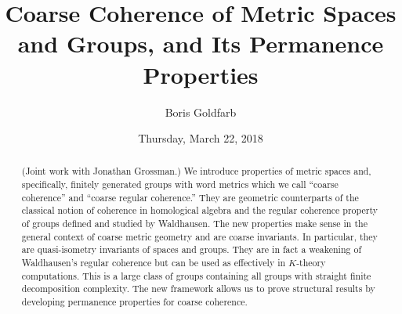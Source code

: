 \documentclass{UAmathtalk}
\author{Boris Goldfarb}
\title{Coarse Coherence of Metric Spaces and Groups, and Its Permanence Properties}
\date{Thursday, March 22, 2018}
\begin{document}
\maketitle

\begin{abstract}
(Joint work with Jonathan Grossman.)
We introduce properties of metric spaces and, specifically, finitely generated groups with word metrics which we call ``coarse coherence'' and ``coarse regular coherence.'' They are geometric counterparts of the classical notion of coherence in homological algebra and the regular coherence property of groups defined and studied by Waldhausen. The new properties make sense in the general context of coarse metric geometry and are coarse invariants. In particular, they are quasi-isometry invariants of spaces and groups. They are in fact a weakening of Waldhausen's regular coherence but can be used as effectively in $K$-theory computations. This is a large class of groups containing all groups with straight finite decomposition complexity. The new framework allows us to prove structural results by developing permanence properties for coarse coherence.
\end{abstract}
\end{document}

